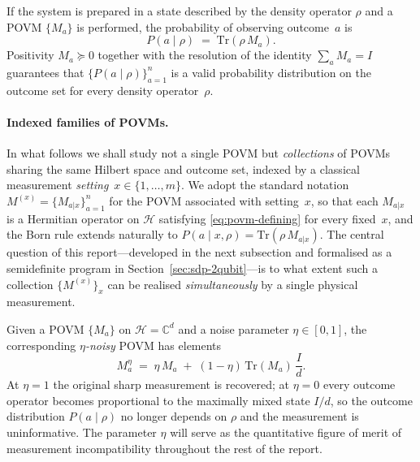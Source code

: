 \begin{definition}
\label{def:born}
If the system is prepared in a state described by the density operator
$\rho$ and a POVM $\{M_a\}$ is performed, the probability of
observing outcome~$a$ is
\begin{equation}
  P(a \mid \rho) \;=\; \text{Tr}(\rho\, M_a).
  \label{eq:born}
\end{equation}
Positivity $M_a \succeq 0$ together with the resolution of the
identity $\sum_a M_a = I$ guarantees that
$\{P(a \mid \rho)\}_{a = 1}^{n}$ is a valid probability distribution
on the outcome set for every density operator~$\rho$.
\end{definition}

\paragraph{Indexed families of POVMs.}
In what follows we shall study not a single POVM but \emph{collections}
of POVMs sharing the same Hilbert space and outcome set, indexed by a
classical measurement \emph{setting}~$x \in \{1, \dots, m\}$. We
adopt the standard notation $M^{(x)} = \{M_{a|x}\}_{a = 1}^{n}$ for
the POVM associated with setting~$x$, so that each $M_{a|x}$ is a
Hermitian operator on $\mathcal{H}$ satisfying
\eqref{eq:povm-defining} for every fixed~$x$, and the Born rule
extends naturally to $P(a \mid x, \rho) = \text{Tr}(\rho\, M_{a|x})$.
The central question of this report---developed in the next
subsection and formalised as a semidefinite program in
Section~\ref{sec:sdp-2qubit}---is to what extent such a collection
$\{M^{(x)}\}_{x}$ can be realised \emph{simultaneously} by a single
physical measurement.

\begin{definition}
\label{def:white-noise}
Given a POVM $\{M_a\}$ on $\mathcal{H} = \mathbb{C}^{d}$ and a noise
parameter $\eta \in [0, 1]$, the corresponding \emph{$\eta$-noisy}
POVM has elements
\begin{equation}
  M^{\eta}_{a} \;=\; \eta\, M_{a} \;+\; (1 - \eta)\, \text{Tr}(M_a)\,
                     \frac{I}{d}.
  \label{eq:noisy-povm}
\end{equation}
At $\eta = 1$ the original sharp measurement is recovered; at
$\eta = 0$ every outcome operator becomes proportional to the
maximally mixed state $I/d$, so the outcome distribution
$P(a \mid \rho)$ no longer depends on $\rho$ and the measurement is
uninformative. The parameter $\eta$ will serve as the quantitative
figure of merit of measurement incompatibility throughout the rest of
the report.
\end{definition}
